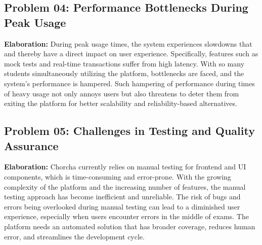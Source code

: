 \documentclass[12pt,a4paper,oneside]{book}
\begin{document}
\subsection{Problem 04: Performance Bottlenecks During Peak Usage}
\textbf{Elaboration:} During peak usage times, the system experiences slowdowns that and thereby have a direct impact on user experience. Specifically, features such as mock tests and real-time transactions suffer from high latency. With so many students simultaneously utilizing the platform, bottlenecks are faced, and the system's performance is hampered. Such hampering of performance during times of heavy usage not only annoys users but also threatens to deter them from exiting the platform for better scalability and reliability-based alternatives.

\subsection{Problem 05: Challenges in Testing and Quality Assurance}
\textbf{Elaboration:} Chorcha currently relies on manual testing for frontend and UI components, which is time-consuming and error-prone. With the growing complexity of the platform and the increasing number of features, the manual testing approach has become inefficient and unreliable. The risk of bugs and errors being overlooked during manual testing can lead to a diminished user experience, especially when users encounter errors in the middle of exams. The platform needs an automated solution that has broader coverage, reduces human error, and streamlines the development cycle.
\end{document}
